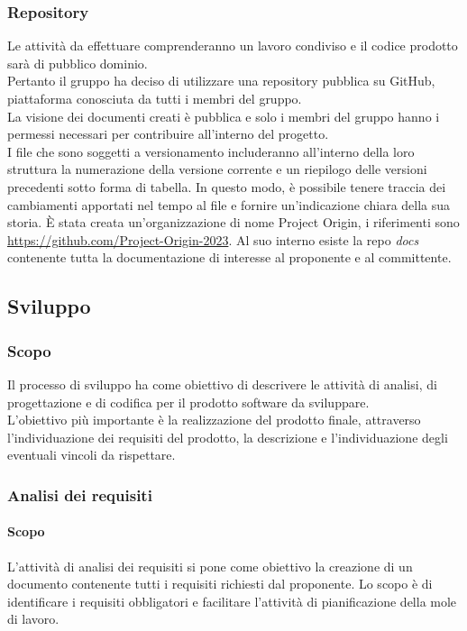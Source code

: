\subsubsection{Repository} 
Le attività da effettuare comprenderanno un lavoro condiviso e il codice prodotto sarà di pubblico dominio. \\
Pertanto il gruppo ha deciso di utilizzare una repository pubblica su GitHub, piattaforma conosciuta da tutti i membri del gruppo. \\
La visione dei documenti creati è pubblica e solo i membri del gruppo hanno i permessi necessari per contribuire all'interno del progetto. \\
I file che sono soggetti a versionamento includeranno all'interno della loro struttura la numerazione della versione corrente e un riepilogo 
delle versioni precedenti sotto forma di tabella. In questo modo, è possibile tenere traccia dei cambiamenti apportati nel tempo al file e 
fornire un'indicazione chiara della sua storia.
È stata creata un'organizzazione di nome Project Origin, i riferimenti sono \url{https://github.com/Project-Origin-2023}.
Al suo interno esiste la repo \textit{docs} contenente tutta la documentazione di interesse al proponente e al committente.

\subsection{Sviluppo} 
\subsubsection{Scopo} 
Il processo di sviluppo ha come obiettivo di descrivere le attività di analisi, di progettazione e di codifica per il prodotto software da sviluppare. \\
L'obiettivo più importante è la realizzazione del prodotto finale, attraverso l'individuazione dei requisiti del prodotto, 
la descrizione e l'individuazione degli eventuali vincoli da rispettare.


\subsubsection{Analisi dei requisiti} 
\paragraph{Scopo} 
L'attività di analisi dei requisiti si pone come obiettivo la creazione di un documento contenente tutti i requisiti richiesti dal proponente.
Lo scopo è di identificare i requisiti obbligatori e facilitare l'attività di pianificazione della mole di lavoro.

